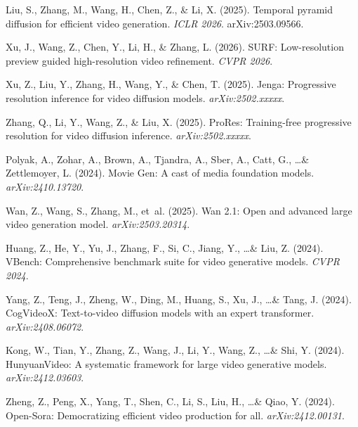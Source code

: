 Liu, S., Zhang, M., Wang, H., Chen, Z., \& Li, X. (2025).
\newblock Temporal pyramid diffusion for efficient video generation.
\newblock \emph{ICLR 2026}. arXiv:2503.09566.

Xu, J., Wang, Z., Chen, Y., Li, H., \& Zhang, L. (2026).
\newblock SURF: Low-resolution preview guided high-resolution video refinement.
\newblock \emph{CVPR 2026}.

Xu, Z., Liu, Y., Zhang, H., Wang, Y., \& Chen, T. (2025).
\newblock Jenga: Progressive resolution inference for video diffusion models.
\newblock \emph{arXiv:2502.xxxxx}.

Zhang, Q., Li, Y., Wang, Z., \& Liu, X. (2025).
\newblock ProRes: Training-free progressive resolution for video diffusion inference.
\newblock \emph{arXiv:2502.xxxxx}.

Polyak, A., Zohar, A., Brown, A., Tjandra, A., Sber, A., Catt, G., \ldots \& Zettlemoyer, L. (2024).
\newblock Movie Gen: A cast of media foundation models.
\newblock \emph{arXiv:2410.13720}.

Wan, Z., Wang, S., Zhang, M., et~al. (2025).
\newblock Wan 2.1: Open and advanced large video generation model.
\newblock \emph{arXiv:2503.20314}.

Huang, Z., He, Y., Yu, J., Zhang, F., Si, C., Jiang, Y., \ldots \& Liu, Z. (2024).
\newblock VBench: Comprehensive benchmark suite for video generative models.
\newblock \emph{CVPR 2024}.

Yang, Z., Teng, J., Zheng, W., Ding, M., Huang, S., Xu, J., \ldots \& Tang, J. (2024).
\newblock CogVideoX: Text-to-video diffusion models with an expert transformer.
\newblock \emph{arXiv:2408.06072}.

Kong, W., Tian, Y., Zhang, Z., Wang, J., Li, Y., Wang, Z., \ldots \& Shi, Y. (2024).
\newblock HunyuanVideo: A systematic framework for large video generative models.
\newblock \emph{arXiv:2412.03603}.

Zheng, Z., Peng, X., Yang, T., Shen, C., Li, S., Liu, H., \ldots \& Qiao, Y. (2024).
\newblock Open-Sora: Democratizing efficient video production for all.
\newblock \emph{arXiv:2412.00131}.



